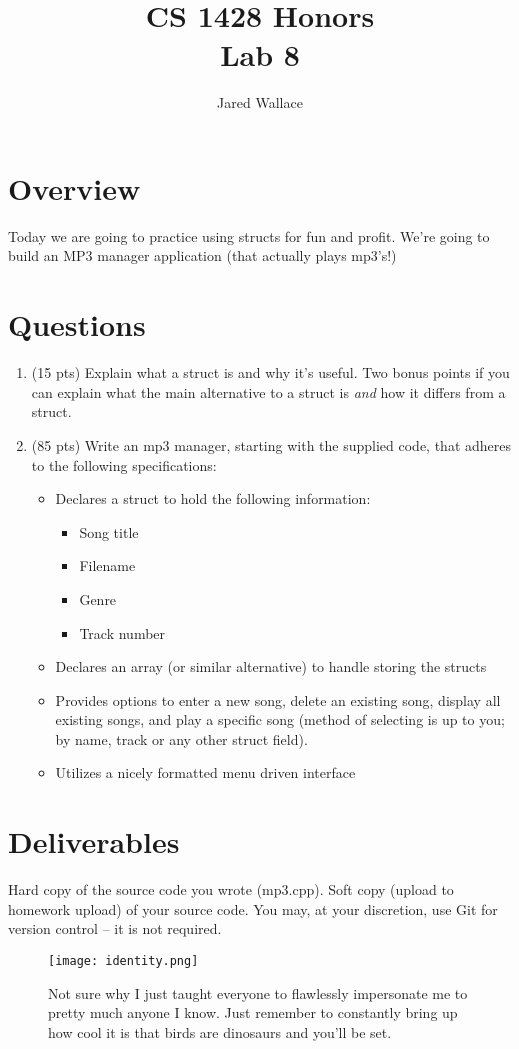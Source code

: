 \documentclass[letterpaper,12pt]{article}
\title{\Large CS 1428 Honors\\Lab 8}
\author{Jared Wallace}
\date{}
\begin{document}
\maketitle

\vspace{30mm}

\section*{Overview}
Today we are going to practice using structs for fun and profit. We're
going to build an MP3 manager application (that actually plays mp3's!)
\section*{Questions}
\begin{enumerate}
    \item (15 pts) Explain what a struct is and why it's useful. Two bonus points if
        you can explain what the main alternative to a struct is \emph{and} how
        it differs from a struct.
    \item (85 pts) Write an mp3 manager, starting with the supplied code, that
        adheres to the following specifications:
    \begin{itemize}
        \item Declares a struct to hold the following information:
            \begin{itemize}
                \item Song title
                \item Filename
                \item Genre
                \item Track number
            \end{itemize}
        \item Declares an array (or similar alternative) to handle storing the structs
        \item Provides options to enter a new song, delete an existing song, display
            all existing songs, and play a specific song (method of selecting is up to you;
            by name, track or any other struct field).
        \item Utilizes a nicely formatted menu driven interface
    \end{itemize}
\end{enumerate}
\section*{Deliverables}
Hard copy of the source code you wrote (mp3.cpp). Soft copy (upload to homework upload) of
your source code. You may, at your discretion, use Git for version control -- it is not required.

\begin{figure}[ht!]
	\centering
	\texttt{[image: identity.png]}
    \caption*{Not sure why I just taught everyone to flawlessly impersonate me to pretty much anyone I know. Just remember to constantly bring up how cool it is that birds are dinosaurs and you'll be set.}
\end{figure}
\end{document}
